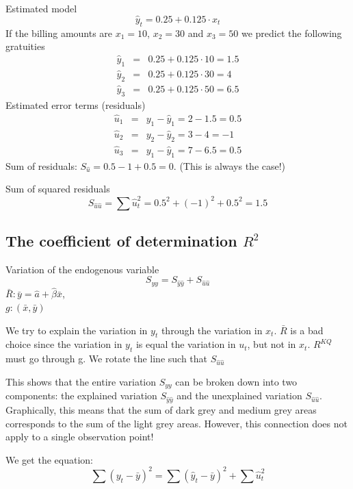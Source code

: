 \documentclass{article}
\begin{document}
Estimated model%
\[
\hat{y}_{t}=0.25+0.125\cdot x_{t} 
\]%
If the billing amounts are $x_{1}=10$, $x_{2}=30$ and $x_{3}=50$ we predict
the following gratuities%
\begin{eqnarray*}
	\hat{y}_{1} &=&0.25+0.125\cdot 10=1.5 \\
	\hat{y}_{2} &=&0.25+0.125\cdot 30=4 \\
	\hat{y}_{3} &=&0.25+0.125\cdot 50=6.5
\end{eqnarray*}%
Estimated error terms (residuals)%
\begin{eqnarray*}
	\hat{u}_{1} &=&y_{1}-\hat{y}_{1}=2-1.5=0.5 \\
	\hat{u}_{2} &=&y_{2}-\hat{y}_{2}=3-4=-1 \\
	\hat{u}_{3} &=&y_{1}-\hat{y}_{1}=7-6.5=0.5
\end{eqnarray*}%
Sum of residuals: $S_{\hat{u}}=0.5-1+0.5=0$. (This is always the case!)

Sum of squared residuals%
\[
S_{\hat{u}\hat{u}}=\sum \hat{u}_{t}^{2}=0.5^{2}+\left( -1\right)
^{2}+0.5^{2}=1.5 
\]


\subsection{The coefficient of determination $R^{2}$}
Variation of the endogenous variable
\[ S_{yy}=S_{\hat{y}\hat{y}}+S_{\hat{u}\hat{u}} \]
$\bar{R}: \bar{y}=\hat{a} + \hat{\beta}\bar{x}$,\\$g:(\bar{x},\bar{y})$
\begin{center}
	
\end{center}
We try to explain the variation in $y_t$ through the variation in $x_t$. $\bar{R}$ is a bad choice since the variation in $y_t$ is equal the variation in $u_t$, but not in $x_t$. $R^{KQ}$ must go through g. We rotate the line such that $S_{\hat{u}\hat{u}}$

\begin{center}
	
\end{center}
This shows that the entire variation $S_{yy}$ can be broken down into two components: the explained variation $S_{\hat{y}\hat{y}}$ and the unexplained variation $S_{\hat{u}\hat{u}}$. Graphically, this means that the sum of dark grey and medium grey areas corresponds to the sum of the light grey areas. However, this connection does not apply to a single observation point!

We get the equation:
\[ \sum \left( y_{t}-\bar{y}\right) ^{2}=\sum \left( \hat{y}_{t}-\bar{y}\right)^{2}+\sum \hat{u}_{t}^{2} \]
\end{document}
